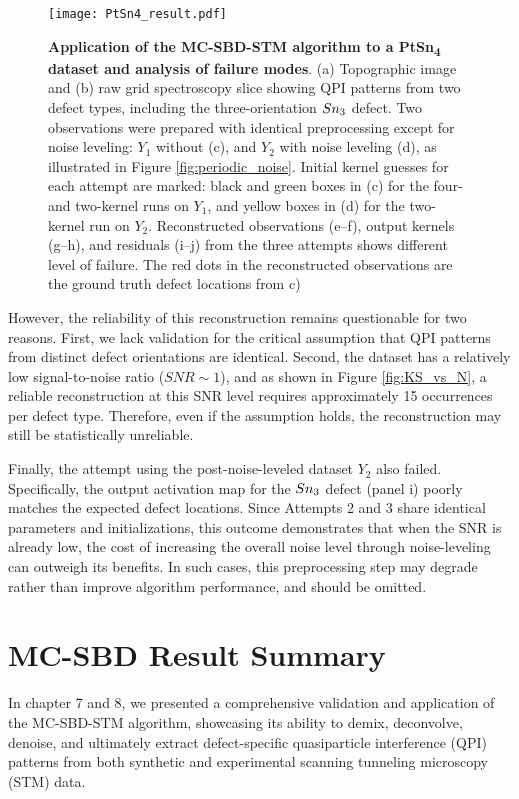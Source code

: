 \begin{figure}
	\texttt{[image: PtSn4\_result.pdf]} 
	\centering
	\caption[\textbf{Application of the MC-SBD-STM algorithm to a PtSn\textsubscript{4} dataset and analysis of failure modes}]{\textbf{Application of the MC-SBD-STM algorithm to a PtSn\textsubscript{4} dataset and analysis of failure modes}. (a) Topographic image and (b) raw grid spectroscopy slice showing QPI patterns from two defect types, including the three-orientation $Sn\textsubscript{3}$ defect. Two observations were prepared with identical preprocessing except for noise leveling: $Y_1$ without (c), and $Y_2$ with noise leveling (d), as illustrated in Figure \ref{fig:periodic_noise}. Initial kernel guesses for each attempt are marked: black and green boxes in (c) for the four- and two-kernel runs on $Y_1$, and yellow boxes in (d) for the two-kernel run on $Y_2$. Reconstructed observations (e–f), output kernels (g–h), and residuals (i–j) from the three attempts shows different level of failure. The red dots in the reconstructed observations are the ground truth defect locations from c)}
	\label{fig:PtSn4}
\end{figure}

However, the reliability of this reconstruction remains questionable for two reasons. First, we lack validation for the critical assumption that QPI patterns from distinct defect orientations are identical. Second, the dataset has a relatively low signal-to-noise ratio ($SNR\sim 1$), and as shown in Figure \ref{fig:KS_vs_N}, a reliable reconstruction at this SNR level requires approximately 15 occurrences per defect type. Therefore, even if the assumption holds, the reconstruction may still be statistically unreliable.

Finally, the attempt using the post-noise-leveled dataset $Y_2$ also failed. Specifically, the output activation map for the $Sn\textsubscript{3}$ defect (panel i) poorly matches the expected defect locations. Since Attempts 2 and 3 share identical parameters and initializations, this outcome demonstrates that when the SNR is already low, the cost of increasing the overall noise level through noise-leveling can outweigh its benefits. In such cases, this preprocessing step may degrade rather than improve algorithm performance, and should be omitted.


\section{MC-SBD Result Summary}
In chapter 7 and 8, we presented a comprehensive validation and application of the MC-SBD-STM algorithm, showcasing its ability to demix, deconvolve, denoise, and ultimately extract defect-specific quasiparticle interference (QPI) patterns from both synthetic and experimental scanning tunneling microscopy (STM) data.

